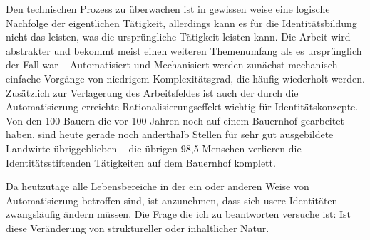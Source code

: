 Den technischen Prozess zu überwachen ist in gewissen weise eine logische Nachfolge der eigentlichen Tätigkeit, allerdings kann es für die Identitätsbildung nicht das leisten, was die ursprüngliche Tätigkeit leisten kann.
Die Arbeit wird abstrakter und bekommt meist einen weiteren Themenumfang als es ursprünglich der Fall war \parencite{ulrich} – Automatisiert und Mechanisiert werden zunächst mechanisch einfache Vorgänge von niedrigem Komplexitätsgrad, die häufig wiederholt werden.
Zusätzlich zur Verlagerung des Arbeitsfeldes ist auch der durch die Automatisierung erreichte Rationalisierungseffekt wichtig für Identitätskonzepte.
Von den 100 Bauern die vor 100 Jahren noch auf einem Bauernhof gearbeitet haben, sind heute gerade noch anderthalb Stellen für sehr gut ausgebildete Landwirte übriggeblieben \parencite{arbeitsfrei} – die übrigen 98,5 Menschen verlieren die Identitätsstiftenden Tätigkeiten auf dem Bauernhof komplett.

Da heutzutage alle Lebensbereiche in der ein oder anderen Weise von Automatisierung betroffen sind, ist anzunehmen, dass sich usere Identitäten zwangsläufig ändern müssen.
Die Frage die ich zu beantworten versuche ist: Ist diese Veränderung von struktureller oder inhaltlicher Natur.

